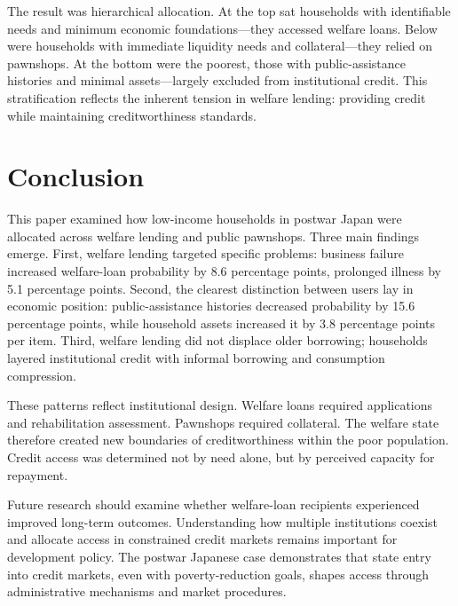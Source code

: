 \documentclass[12pt,a4paper]{article}
\begin{document}
The result was hierarchical allocation. At the top sat households with identifiable needs and minimum economic foundations---they accessed welfare loans. Below were households with immediate liquidity needs and collateral---they relied on pawnshops. At the bottom were the poorest, those with public-assistance histories and minimal assets---largely excluded from institutional credit. This stratification reflects the inherent tension in welfare lending: providing credit while maintaining creditworthiness standards.

\section{Conclusion}

This paper examined how low-income households in postwar Japan were allocated across welfare lending and public pawnshops. Three main findings emerge. First, welfare lending targeted specific problems: business failure increased welfare-loan probability by 8.6 percentage points, prolonged illness by 5.1 percentage points. Second, the clearest distinction between users lay in economic position: public-assistance histories decreased probability by 15.6 percentage points, while household assets increased it by 3.8 percentage points per item. Third, welfare lending did not displace older borrowing; households layered institutional credit with informal borrowing and consumption compression.

These patterns reflect institutional design. Welfare loans required applications and rehabilitation assessment. Pawnshops required collateral. The welfare state therefore created new boundaries of creditworthiness within the poor population. Credit access was determined not by need alone, but by perceived capacity for repayment.

Future research should examine whether welfare-loan recipients experienced improved long-term outcomes. Understanding how multiple institutions coexist and allocate access in constrained credit markets remains important for development policy. The postwar Japanese case demonstrates that state entry into credit markets, even with poverty-reduction goals, shapes access through administrative mechanisms and market procedures.

\newpage



\end{document}
